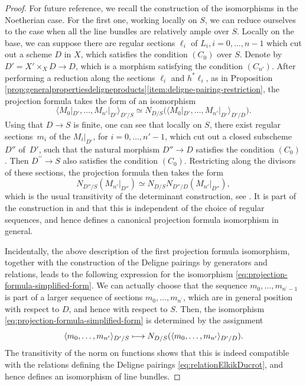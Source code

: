 \documentclass[JEP,XML,SOM,Unicode,published]{cedram}
\newcommand\mto{\mathchoice{\longmapsto}{\mapsto}{\mapsto}{\mapsto}}
\theoremstyle{plain}
\theoremstyle{definition}
\begin{document}
\begin{proof}
For future reference, we recall the construction of the isomorphisms in the Noetherian case. For the first one, working locally on $S$, we can reduce ourselves to the case when all the line bundles are relatively ample over $S$. Locally on the base, we can suppose there are regular sections $\ell_i$ of $L_{i}, i =0,\ldots, n-1$ which cut out a scheme $D$ in $X$, which satisfies the condition $(C_0)$ over $S$. Denote by $D' = X' \times_X D \to D$, which is a morphism satisfying the condition $(C_{n'})$. After performing a reduction along the sections $\ell_i$ and $h^\ast \ell_i$, as in Proposition \ref{prop:generalpropertiesdeligneproducts}\eqref{item:deligne-pairing-restriction}, the projection formula takes the form of an isomorphism
\begin{equation}\label{eq:projection-formula-simplified-form}
\langle M_{0} |_{D'}, \ldots, M_{n'} |_{D'}\rangle_{D'/S} \simeq N_{D/S} \bigl(\langle M_{0}|_{D'}, \ldots, M_{n'}|_{D'}\rangle_{D'/D}\bigr).
\end{equation}
Using that $D \to S$ is finite, one can see that locally on $S$, there exist regular sections~$m_{i}$ of the $M_{i}|_{D'}$, for $i=0,\ldots, n'-1$, which cut out a closed subscheme $D''$ of~$D'$, such that the natural morphism $D'' \to D$ satisfies the condition $(C_0)$. Then $D^{\prime\prime}\to S$ also satisfies the condition $(C_{0})$. Restricting along the divisors of these sections, the projection formula then takes the form
\begin{displaymath}
N_{D''/S} (M_{n'}|_{D''}) \simeq N_{D/S} N_{D''/D} (M_{n'}|_{D''}),
\end{displaymath}
which is the usual transitivity of the determinant construction, see \cite[Lem.\,21.5.7.2]{EGAIV4}. It is part of the construction in \cite[\textsection IV.2]{Elkikfib} and \cite[]{Munoz} that this is independent of the choice of regular sequences, and hence defines a canonical projection formula isomorphism in general.

Incidentally, the above description of the first projection formula isomorphism, together with the construction of the Deligne pairings by generators and relations, leads to the following expression for the isomorphism \eqref{eq:projection-formula-simplified-form}. We can actually choose that the sequence $m_{0},\ldots,m_{n^{\prime}-1}$ is part of a larger sequence of sections $m_{0},\ldots,m_{n^{\prime}}$, which are in general position with respect to $D$, and hence with respect to $S$. Then, the isomorphism \eqref{eq:projection-formula-simplified-form} is determined by the assignment
\begin{displaymath}
\langle m_{0},\ldots, m_{n^{\prime}}\rangle_{D^{\prime}/S}\mto N_{D/S}(\langle m_{0},\ldots, m_{n^{\prime}}\rangle_{D^{\prime}/D}).
\end{displaymath}
The transitivity of the norm on functions shows that this is indeed compatible with the relations defining the Deligne pairings \eqref{eq:relationElkikDucrot}, and hence defines an isomorphism of line bundles.


\end{proof}
\end{document}

